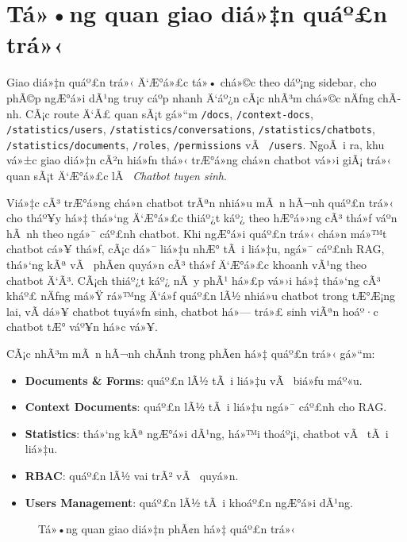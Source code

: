 ﻿\documentclass[12pt,a4paper]{report}
\begin{document}
\section{Tá»•ng quan giao diá»‡n quáº£n trá»‹}

Giao diá»‡n quáº£n trá»‹ Ä‘Æ°á»£c tá»• chá»©c theo dáº¡ng sidebar, cho phÃ©p ngÆ°á»i dÃ¹ng truy cáº­p nhanh Ä‘áº¿n cÃ¡c nhÃ³m chá»©c nÄƒng chÃ­nh. CÃ¡c route Ä‘Ã£ quan sÃ¡t gá»“m \texttt{/docs}, \texttt{/context-docs}, \texttt{/statistics/users}, \texttt{/statistics/conversations}, \texttt{/statistics/chatbots}, \texttt{/statistics/documents}, \texttt{/roles}, \texttt{/permissions} vÃ  \texttt{/users}. NgoÃ i ra, khu vá»±c giao diá»‡n cÃ²n hiá»ƒn thá»‹ trÆ°á»ng chá»n chatbot vá»›i giÃ¡ trá»‹ quan sÃ¡t Ä‘Æ°á»£c lÃ  \textit{Chatbot tuyen sinh}.

Viá»‡c cÃ³ trÆ°á»ng chá»n chatbot trÃªn nhiá»u mÃ n hÃ¬nh quáº£n trá»‹ cho tháº¥y há»‡ thá»‘ng Ä‘Æ°á»£c thiáº¿t káº¿ theo hÆ°á»›ng cÃ³ thá»ƒ váº­n hÃ nh theo ngá»¯ cáº£nh chatbot. Khi ngÆ°á»i quáº£n trá»‹ chá»n má»™t chatbot cá»¥ thá»ƒ, cÃ¡c dá»¯ liá»‡u nhÆ° tÃ i liá»‡u, ngá»¯ cáº£nh RAG, thá»‘ng kÃª vÃ  phÃ¢n quyá»n cÃ³ thá»ƒ Ä‘Æ°á»£c khoanh vÃ¹ng theo chatbot Ä‘Ã³. CÃ¡ch thiáº¿t káº¿ nÃ y phÃ¹ há»£p vá»›i há»‡ thá»‘ng cÃ³ kháº£ nÄƒng má»Ÿ rá»™ng Ä‘á»ƒ quáº£n lÃ½ nhiá»u chatbot trong tÆ°Æ¡ng lai, vÃ­ dá»¥ chatbot tuyá»ƒn sinh, chatbot há»— trá»£ sinh viÃªn hoáº·c chatbot tÆ° váº¥n há»c vá»¥.

CÃ¡c nhÃ³m mÃ n hÃ¬nh chÃ­nh trong phÃ¢n há»‡ quáº£n trá»‹ gá»“m:

\begin{itemize}
    \item \textbf{Documents \& Forms}: quáº£n lÃ½ tÃ i liá»‡u vÃ  biá»ƒu máº«u.
    \item \textbf{Context Documents}: quáº£n lÃ½ tÃ i liá»‡u ngá»¯ cáº£nh cho RAG.
    \item \textbf{Statistics}: thá»‘ng kÃª ngÆ°á»i dÃ¹ng, há»™i thoáº¡i, chatbot vÃ  tÃ i liá»‡u.
    \item \textbf{RBAC}: quáº£n lÃ½ vai trÃ² vÃ  quyá»n.
    \item \textbf{Users Management}: quáº£n lÃ½ tÃ i khoáº£n ngÆ°á»i dÃ¹ng.
\end{itemize}

\begin{figure}[H]
    \centering
    \caption{Tá»•ng quan giao diá»‡n phÃ¢n há»‡ quáº£n trá»‹}
    \label{fig:admin-overview}
\end{figure}
\end{document}
